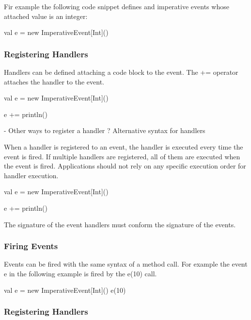 \documentclass[10pt,a4paper]{article}
\newcommand{\code}[1]{{\fontfamily{cmtt}\small\selectfont#1}}
\begin{document}
Fir example the following code snippet defines and imperative events
whose attached value is an integer:
\begin{codenv}
val e = new ImperativeEvent[Int]()
\end{codenv}

\subsubsection{Registering Handlers}

Handlers can be defined attaching a code block to the event. The
\code{+=} operator attaches the handler to the event.

\begin{codenv}
val e = new ImperativeEvent[Int]()

e += { println() }
\end{codenv}

- Other ways to register a handler ? Alternative syntax for handlers


When a handler is registered to an event, the handler is executed
every time the event is fired. If multiple handlers are registered,
all of them are executed when the event is fired. Applications should
not rely on any specific execution order for handler execution.

\begin{codenv}
val e = new ImperativeEvent[Int]()

e += { println() }
\end{codenv}


The signature of the event handlers must conform the signature of the
events.





\subsubsection{Firing Events}


Events can be fired with the same syntax of a method call. For example
the event \code{e} in the following example is fired by the
\code{e(10)} call.

\begin{codenv}
val e = new ImperativeEvent[Int]()
e(10)
\end{codenv}



\subsubsection{Registering Handlers}
\end{document}
